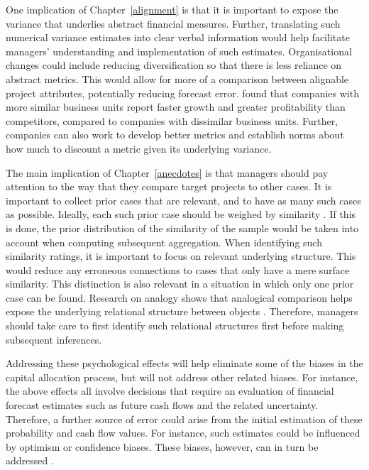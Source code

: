 \documentclass[a4paper, nobind, dvipsnames]{templates/ociamthesis}
\theoremstyle{definition}
\theoremstyle{definition}
\theoremstyle{definition}
\theoremstyle{definition}
\theoremstyle{remark}
\begin{document}
One implication of Chapter~\ref{alignment} is that it is important to expose
the variance that underlies abstract financial measures. Further, translating
such numerical variance estimates into clear verbal information would help
facilitate managers' understanding and implementation of such estimates.
Organisational changes could include reducing diversification so that there is
less reliance on abstract metrics. This would allow for more of a comparison
between alignable project attributes, potentially reducing forecast error.
\textcite{koller2017} found that companies with more similar business units report faster
growth and greater profitability than competitors, compared to companies with
dissimilar business units. Further, companies can also work to develop better
metrics and establish norms about how much to discount a metric given its
underlying variance.

The main implication of Chapter~\ref{anecdotes} is that managers should pay
attention to the way that they compare target projects to other cases. It is
important to collect prior cases that are relevant, and to have as many such
cases as possible. Ideally, each such prior case should be weighed by similarity
\autocite{lovallo2012}. If this is done, the prior distribution of the similarity of the
sample would be taken into account when computing subsequent aggregation. When
identifying such similarity ratings, it is important to focus on relevant
underlying structure. This would reduce any erroneous connections to cases that
only have a mere surface similarity. This distinction is also relevant in a
situation in which only one prior case can be found. Research on analogy shows
that analogical comparison helps expose the underlying relational structure
between objects \autocites[e.g.,][]{kurtz2013,markman1993}. Therefore, managers should
take care to first identify such relational structures first before making
subsequent inferences.

Addressing these psychological effects will help eliminate some of the biases in
the capital allocation process, but will not address other related biases. For
instance, the above effects all involve decisions that require an evaluation of
financial forecast estimates such as future cash flows and the related
uncertainty. Therefore, a further source of error could arise from the initial
estimation of these probability and cash flow values. For instance, such
estimates could be influenced by optimism or confidence biases. These biases,
however, can in turn be addressed \autocite{flyvbjerg2018}.
\end{document}
